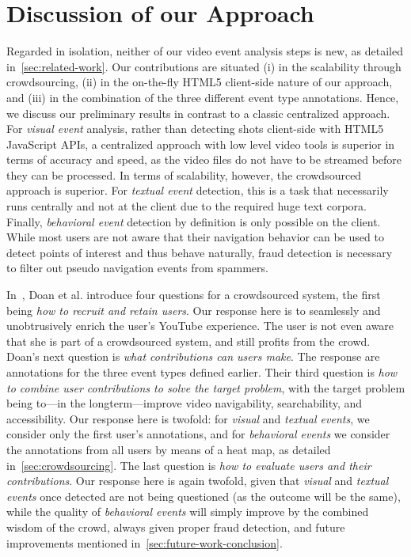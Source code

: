 \documentclass[runningheads,a4paper]{llncs}
\begin{document}
\vspace{-5mm}
\section{Discussion of our Approach}
Regarded in isolation, neither of our video event analysis steps is new, as detailed in~\autoref{sec:related-work}. Our contributions are situated (i) in the scalability through crowdsourcing, (ii) in the on-the-fly HTML5 client-side nature of our approach, and (iii) in the combination of the three different event type annotations. Hence, we discuss our preliminary results in contrast to a classic centralized approach. For \emph{visual event} analysis, rather than detecting shots client-side with HTML5 Java\-Script APIs, a centralized approach with low level video tools is superior in terms of accuracy and speed, as the video files do not have to be streamed before they can be processed. In terms of scalability, however, the crowdsourced approach is superior. For \emph{textual event} detection, this is a task that necessarily runs centrally and not at the client due to the required huge text corpora. Finally, \emph{behavioral event} detection by definition is only possible on the client. While most users are not aware that their navigation behavior can be used to detect points of interest and thus behave naturally, fraud detection is necessary to filter out pseudo navigation events from spammers.

In~\cite{Doan:2011}, Doan et al. introduce four questions for a crowdsourced system, the first being \textit{how to recruit and retain users}. Our response here is to seamlessly and unobtrusively enrich the user's YouTube experience. The user is not even aware that she is part of a crowdsourced system, and still profits from the crowd. Doan's next question is \textit{what contributions can users make}. The response are annotations for the three event types defined earlier. Their third question is \textit{how to combine user contributions to solve the target problem}, with the target problem being to---in the longterm---improve video navigability, searchability, and accessibility.  Our response here is twofold: for \emph{visual} and \emph{textual events}, we consider only the first user's annotations, and for \emph{behavioral events} we consider the annotations from all users by means of a heat map, as detailed in~\autoref{sec:crowdsourcing}. The last question is \textit{how to evaluate users and their contributions}. Our response here is again twofold, given that \emph{visual} and \emph{textual events} once detected are not being questioned (as the outcome will be the same), while the quality of \emph{behavioral events}  will simply improve by the combined wisdom of the crowd, always given proper fraud detection, and future improvements mentioned in~\autoref{sec:future-work-conclusion}.
\end{document}

